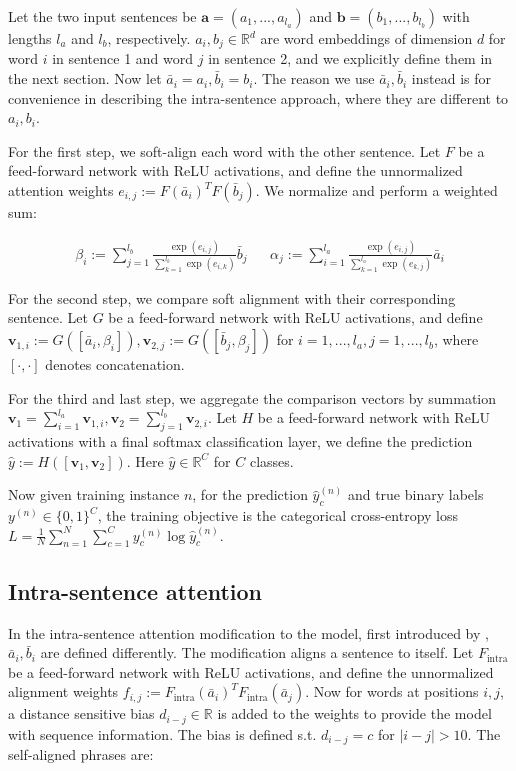 \documentclass{article}
\begin{document}
Let the two input sentences be $\textbf{a}=(a_1,...,a_{l_a})$ and $\textbf{b}=(b_1,...,b_{l_b})$ with lengths $l_a$ and $l_b$, respectively. $a_i, b_j\in\mathbb{R}^d$ are word embeddings of dimension $d$ for word $i$ in sentence 1 and word $j$ in sentence 2, and we explicitly define them in the next section. Now let $\bar{a}_i = a_i, \bar{b}_i = b_i$. The reason we use $\bar{a}_i, \bar{b}_i$ instead is for convenience in describing the intra-sentence approach, where they are different to $a_i, b_i$.

For the first step, we soft-align each word with the other sentence. Let $F$ be a feed-forward network with ReLU activations, and define the unnormalized attention weights $e_{i,j} := F(\bar{a}_i)^T F(\bar{b}_j)$. We normalize and perform a weighted sum:

\begin{align*}
    \beta_i := \sum_{j=1}^{l_b} \frac{\exp(e_{i,j})}{\sum_{k=1}^{l_b}\exp(e_{i,k})} \bar{b}_j &&
    \alpha_j := \sum_{i=1}^{l_a} \frac{\exp(e_{i,j})}{\sum_{k=1}^{l_a}\exp(e_{k,j})} \bar{a}_i
\end{align*}

For the second step, we compare soft alignment with their corresponding sentence. Let $G$ be a feed-forward network with ReLU activations, and define $\mathbf{v}_{1,i} := G([\bar{a}_i, \beta_i]), \mathbf{v}_{2,j} := G([\bar{b}_j, \beta_j])$ for $i=1,...,l_a, j=1,...,l_b$, where $[\cdot, \cdot]$ denotes concatenation.

For the third and last step, we aggregate the comparison vectors by summation $\mathbf{v}_1 = \sum_{i=1}^{l_a}\mathbf{v}_{1,i}, \mathbf{v}_2 = \sum_{j=1}^{l_b}\mathbf{v}_{2,i}$. Let $H$ be a feed-forward network with ReLU activations with a final softmax classification layer, we define the prediction $\hat{y} := H([\mathbf{v}_1, \mathbf{v}_2])$. Here $\hat{y}\in\mathbb{R}^C$ for $C$ classes.

Now given training instance $n$, for the prediction $\hat{y}_c^{(n)}$ and true binary labels $y^{(n)}\in\{0, 1\}^C$, the training objective is the categorical cross-entropy loss $L = \frac{1}{N} \sum_{n=1}^N \sum_{c=1}^C y_c^{(n)} \log \hat{y}_c^{(n)}$.

\subsection{Intra-sentence attention}
In the intra-sentence attention modification to the model, first introduced by \cite{cheng_long_2016}, $\bar{a}_i, \bar{b}_i$ are defined differently. The modification aligns a sentence to itself. Let $F_\text{intra}$ be a feed-forward network with ReLU activations, and define the unnormalized alignment weights $f_{i,j} := F_\text{intra}(\bar{a}_i)^T F_\text{intra}(\bar{a}_j)$. Now for words at positions $i, j$, a distance sensitive bias $d_{i-j}\in\mathbb{R}$ is added to the weights to provide the model with sequence information. The bias is defined s.t. $d_{i-j} = c$ for $|i-j| > 10$. The self-aligned phrases are:
\end{document}
